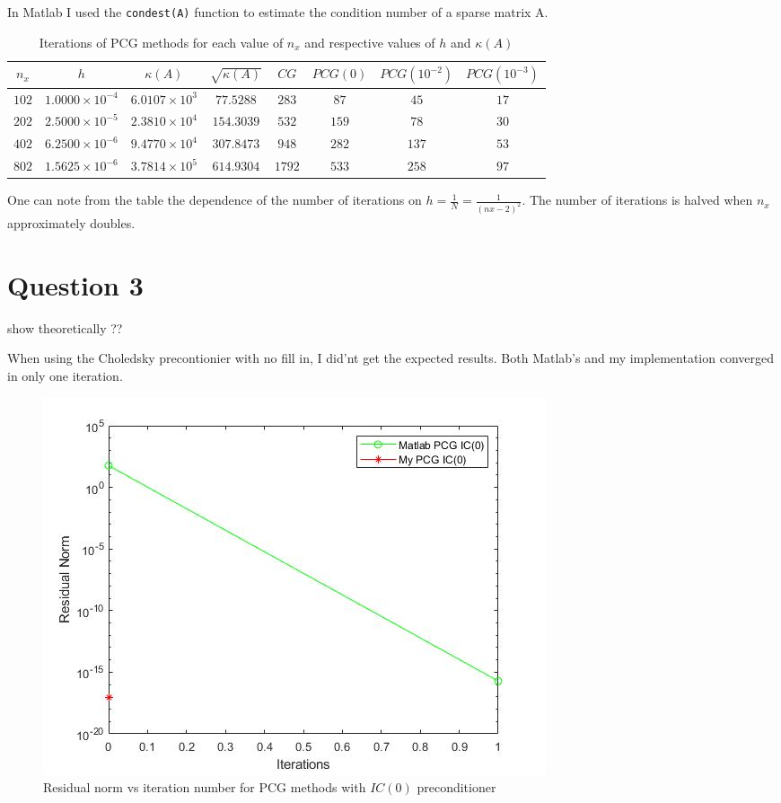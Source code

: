 \documentclass[a4paper, 11pt]{article}
\begin{document}
			In Matlab I used the \texttt{condest(A)} function to estimate the condition number of a sparse matrix A.
		
			\begin{table}[H]
				\centering
				\begin{tabular}{c|c|c|c|c|c|c|c}
					$n_x$   & $ h $						& $\kappa(A)$			 & $ \sqrt{\kappa(A)} $& $ CG $ & $ PCG(0) $& $PCG(10^{-2})$& $PCG(10^{-3})$ \\ \hline
					$ 102 $ & $ 1.0000 \times 10^{-4} $ & $ 6.0107 \times 10^3 $ & $ 77.5288 $ 		& $ 283 $ 	& $ 87 $ 	& $ 45 $ 		& $ 17 $ 		\\ \hline
					$ 202 $ & $ 2.5000 \times 10^{-5} $ & $ 2.3810 \times 10^4 $ & $ 154.3039 $ 	& $ 532 $ 	& $ 159 $ 	& $ 78 $ 		& $ 30 $ 		\\ \hline
					$ 402 $ & $ 6.2500 \times 10^{-6} $ & $ 9.4770 \times 10^4 $ & $ 307.8473 $ 	& $ 948 $ 	& $ 282 $ 	& $ 137 $ 		& $ 53 $		\\ \hline
					$ 802 $ & $ 1.5625 \times 10^{-6} $ & $ 3.7814 \times 10^5 $ & $ 614.9304 $ 	& $ 1792 $	& $ 533 $ 	& $ 258 $ 		& $ 97 $ 		\\ 
				\end{tabular}
				\caption{Iterations of PCG methods for each value of $n_x$ and respective values of $h$ and $\kappa(A)$}
				\label{table:ex2}
			\end{table}	
		
			One can note from the table the dependence of the number of iterations on $ h = \frac{1}{N} = \frac{1}{(nx-2)^2} $.
			The number of iterations is halved when $n_x$ approximately doubles.		
			
				
		\section*{Question 3}
			show theoretically ??
			
			When using the Choledsky precontionier with no fill in, I did'nt get the expected results.
			Both Matlab's and my implementation converged in only one iteration.
			
			\begin{figure}[H]
				\centering
				\includegraphics[width=.6\linewidth]{ex3.jpg}
				\caption{Residual norm vs iteration number for PCG methods with $IC(0)$ preconditioner}
				\label{fig:ex3}
			\end{figure}
		
\end{document}
